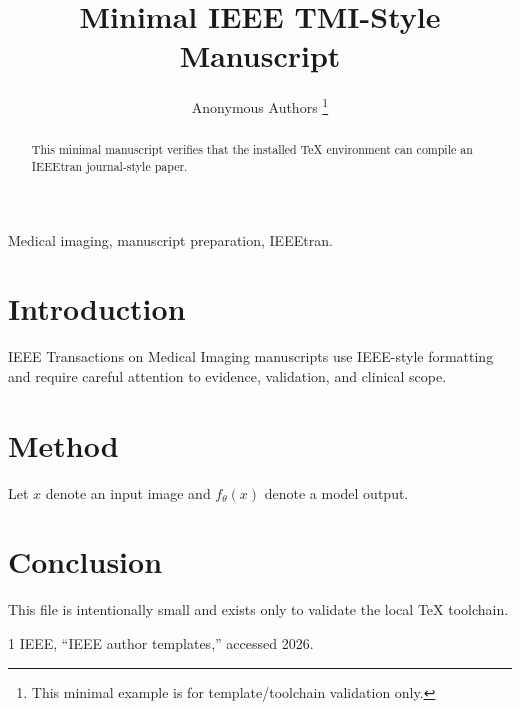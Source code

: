 \documentclass[journal]{IEEEtran}
\title{Minimal IEEE TMI-Style Manuscript}
\author{Anonymous Authors%
\thanks{This minimal example is for template/toolchain validation only.}}
\begin{document}
\maketitle

\begin{abstract}
This minimal manuscript verifies that the installed TeX environment can compile an IEEEtran journal-style paper.
\end{abstract}

\begin{IEEEkeywords}
Medical imaging, manuscript preparation, IEEEtran.
\end{IEEEkeywords}

\section{Introduction}
IEEE Transactions on Medical Imaging manuscripts use IEEE-style formatting and require careful attention to evidence, validation, and clinical scope.

\section{Method}
Let \(x\) denote an input image and \(f_\theta(x)\) denote a model output.

\section{Conclusion}
This file is intentionally small and exists only to validate the local TeX toolchain.


\begin{thebibliography}{1}
IEEE, ``IEEE author templates,'' accessed 2026.
\end{thebibliography}
\end{document}
